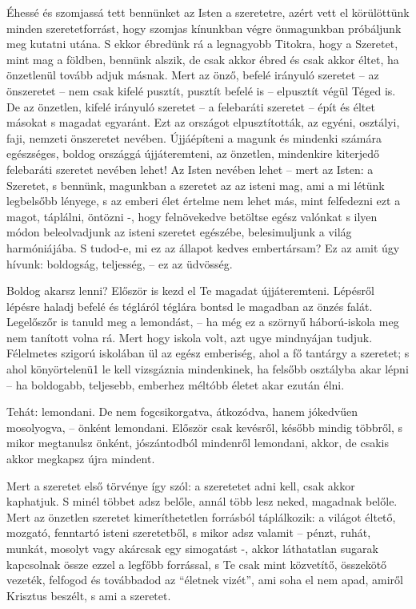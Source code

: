 \documentclass{IEEEtran}
\begin{document}
Éhessé és szomjassá tett bennünket az Isten a szeretetre, azért vett el
körülöttünk minden szeretetforrást, hogy szomjas kínunkban végre önmagunkban
próbáljunk meg kutatni utána. S ekkor ébredünk rá a legnagyobb Titokra, hogy a
Szeretet, mint mag a földben, bennünk alszik, de csak akkor ébred és csak
akkor éltet, ha önzetlenül tovább adjuk másnak. Mert az önző, befelé irányuló
szeretet – az önszeretet – nem csak kifelé pusztít, pusztít befelé is –
elpusztít végül Téged is. De az önzetlen, kifelé irányuló szeretet – a
felebaráti szeretet – épít és éltet másokat s magadat egyaránt. Ezt az
országot elpusztították, az egyéni, osztályi, faji, nemzeti önszeretet
nevében. Újjáépíteni a magunk és mindenki számára egészséges, boldog országgá
újjáteremteni, az önzetlen, mindenkire kiterjedő felebaráti szeretet nevében
lehet! Az Isten nevében lehet – mert az Isten: a Szeretet, s bennünk,
magunkban a szeretet az az isteni mag, ami a mi létünk legbelsőbb lényege, s
az emberi élet értelme nem lehet más, mint felfedezni ezt a magot, táplálni,
öntözni -, hogy felnövekedve betöltse egész valónkat s ilyen módon
beleolvadjunk az isteni szeretet egészébe, belesimuljunk a világ harmóniájába.
S tudod-e, mi ez az állapot kedves embertársam? Ez az amit úgy hívunk:
boldogság, teljesség, – ez az üdvösség.

Boldog akarsz lenni? Először is kezd el Te magadat újjáteremteni. Lépésről
lépésre haladj befelé és tégláról téglára bontsd le magadban az önzés falát.
Legelőszőr is tanuld meg a lemondást, – ha még ez a szörnyű háború-iskola meg
nem tanított volna rá. Mert hogy iskola volt, azt ugye mindnyájan tudjuk.
Félelmetes szigorú iskolában ül az egész emberiség, ahol a fő tantárgy a
szeretet; s ahol könyörtelenü1 le kell vizsgáznia mindenkinek, ha felsőbb
osztályba akar lépni – ha boldogabb, teljesebb, emberhez méltóbb életet akar
ezután élni.

Tehát: lemondani. De nem fogcsikorgatva, átkozódva, hanem jókedvűen
mosolyogva, – önként lemondani. Először csak kevésről, később mindig többről,
s mikor megtanulsz önként, jószántodból mindenről lemondani, akkor, de csakis
akkor megkapsz újra mindent.

Mert a szeretet első törvénye így szól: a szeretetet adni kell, csak akkor
kaphatjuk. S minél többet adsz belőle, annál több lesz neked, magadnak belőle.
Mert az önzetlen szeretet kimeríthetetlen forrásból táplálkozik: a világot
éltető, mozgató, fenntartó isteni szeretetből, s mikor adsz valamit – pénzt,
ruhát, munkát, mosolyt vagy akárcsak egy simogatást -, akkor láthatatlan
sugarak kapcsolnak össze ezzel a legfőbb forrással, s Te csak mint közvetítő,
összekötő vezeték, felfogod és továbbadod az “életnek vizét”, ami soha el nem
apad, amiről Krisztus beszélt, s ami a szeretet.
\end{document}
